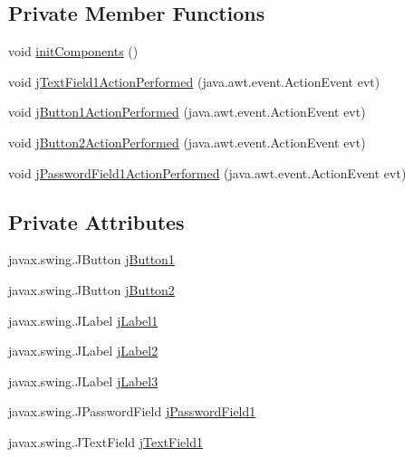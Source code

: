 \subsection*{Private Member Functions}
\begin{DoxyCompactItemize}
\item 
void \mbox{\hyperlink{class_interfaz_package_1_1_interfaz_inicio_a1f93f1fda2fd3be47ef308900314f47a}{init\+Components}} ()
\item 
void \mbox{\hyperlink{class_interfaz_package_1_1_interfaz_inicio_ae2b72822ed503b0e83050f35f8efd996}{j\+Text\+Field1\+Action\+Performed}} (java.\+awt.\+event.\+Action\+Event evt)
\item 
void \mbox{\hyperlink{class_interfaz_package_1_1_interfaz_inicio_a3f0475181f93e77c393fb48e62d06d35}{j\+Button1\+Action\+Performed}} (java.\+awt.\+event.\+Action\+Event evt)
\item 
void \mbox{\hyperlink{class_interfaz_package_1_1_interfaz_inicio_ad2ad6b62da3001452aabde985ec7b648}{j\+Button2\+Action\+Performed}} (java.\+awt.\+event.\+Action\+Event evt)
\item 
void \mbox{\hyperlink{class_interfaz_package_1_1_interfaz_inicio_a10646879dd0bce67c6df4ba1f8ddaf64}{j\+Password\+Field1\+Action\+Performed}} (java.\+awt.\+event.\+Action\+Event evt)
\end{DoxyCompactItemize}
\subsection*{Private Attributes}
\begin{DoxyCompactItemize}
\item 
javax.\+swing.\+J\+Button \mbox{\hyperlink{class_interfaz_package_1_1_interfaz_inicio_ac4f7e3c32cd3ffd80b806828426752a5}{j\+Button1}}
\item 
javax.\+swing.\+J\+Button \mbox{\hyperlink{class_interfaz_package_1_1_interfaz_inicio_a0b17a44506b3f0598b3edabaae5099ec}{j\+Button2}}
\item 
javax.\+swing.\+J\+Label \mbox{\hyperlink{class_interfaz_package_1_1_interfaz_inicio_a6fa5563033504d87402e1abe1b520bc2}{j\+Label1}}
\item 
javax.\+swing.\+J\+Label \mbox{\hyperlink{class_interfaz_package_1_1_interfaz_inicio_a57d053ea1c64fdb320d8930aaf4861e9}{j\+Label2}}
\item 
javax.\+swing.\+J\+Label \mbox{\hyperlink{class_interfaz_package_1_1_interfaz_inicio_a680b59c8dabd737e6017bcb2fb35d93a}{j\+Label3}}
\item 
javax.\+swing.\+J\+Password\+Field \mbox{\hyperlink{class_interfaz_package_1_1_interfaz_inicio_a8fde0bb0a462417298eaf6468976a838}{j\+Password\+Field1}}
\item 
javax.\+swing.\+J\+Text\+Field \mbox{\hyperlink{class_interfaz_package_1_1_interfaz_inicio_a6c0a79d5c225c996fd8e03141682afe7}{j\+Text\+Field1}}
\end{DoxyCompactItemize}


